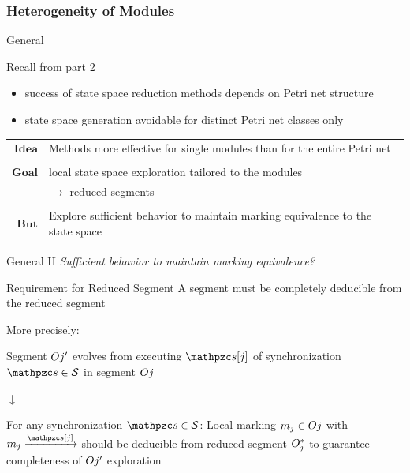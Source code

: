 \documentclass[11pt]{presentation}
\begin{document}
\subsubsection{Heterogeneity of Modules}

\begin{frame}{General}
	\begin{merke}{Recall from part 2}{}
		\begin{itemize}
			\item success of state space reduction methods depends on Petri net structure
			\item state space generation avoidable for distinct Petri net classes only
		\end{itemize}
	\end{merke}

	\bigskip
	\begin{tabular}{r p{10cm}}
		$ \textbf{Idea} $ & Methods more effective for single modules than for the entire Petri net        \\
		                  &                                                                                \\
		$ \textbf{Goal} $ & local state space exploration tailored to the modules                          \\
		                  & $\rightarrow $ reduced segments
		\\
		                  &                                                                                \\
		$ \textbf{But} $  & Explore sufficient behavior to maintain marking equivalence to the state space \\
	\end{tabular}
\end{frame}

\begin{frame}{General II}
	\emph{Sufficient behavior to maintain marking equivalence?}

	\begin{merke}{Requirement for Reduced Segment}{}
		A segment must be completely deducible from the reduced segment
	\end{merke}

	\bigskip
	More precisely:

	\smallskip
	Segment $ \segment{j}^\prime  $ evolves from executing $ \synchronization[j]  $ of synchronization $ \synchronization \in \synchronizations $ in segment $ \segment{j} $

	\begin{center}
		$ \downarrow $
	\end{center}

	For any synchronization $ \synchronization \in \synchronizations $:
	Local marking $ \localmarking{j} \in \segment{j} $
	with $ \localmarking{j} \xrightarrow{\synchronization[j]} $ should be deducible from reduced segment $ \segment[j]^* $ to guarantee completeness of $ \segment{j}^\prime $ exploration
\end{frame}
\end{document}
